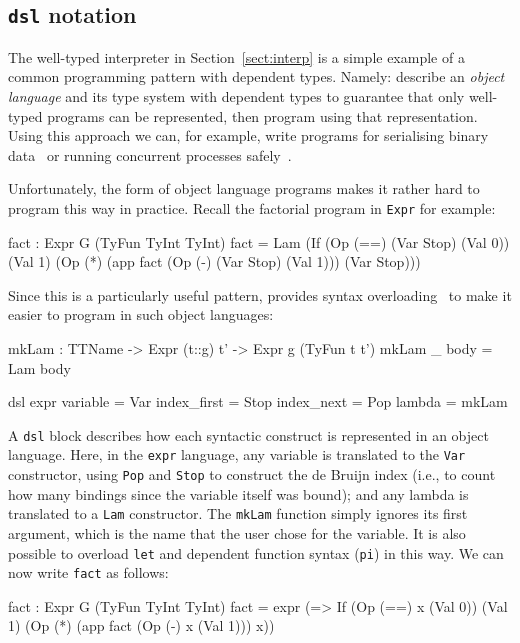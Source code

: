 \subsection{\texttt{dsl} notation}

The well-typed interpreter in Section~\ref{sect:interp} is a simple example of a common programming pattern with dependent types.
Namely: describe an \emph{object language} and its type system with dependent types to guarantee that only well-typed programs can be represented, then program using that representation.
Using this approach we can, for example, write programs for serialising binary data~\cite{plpv11} or running concurrent processes safely~\cite{cbconc-fi}.

Unfortunately, the form of object language programs makes it rather hard to program this way in practice.
Recall the factorial program in \texttt{Expr} for example:

\begin{code}
fact : Expr G (TyFun TyInt TyInt)
fact = Lam (If (Op (==) (Var Stop) (Val 0))
               (Val 1) (Op (*) (app fact (Op (-) (Var Stop) (Val 1)))
                               (Var Stop)))
\end{code}

\noindent
Since this is a particularly useful pattern, \Idris{} provides syntax overloading~\cite{res-dsl-padl12} to make it easier to program in such object languages:

\begin{code}
mkLam : TTName -> Expr (t::g) t' -> Expr g (TyFun t t')
mkLam _ body = Lam body

dsl expr
    variable    = Var
    index_first = Stop
    index_next  = Pop
    lambda      = mkLam
\end{code}

\noindent
A \texttt{dsl} block describes how each syntactic construct is represented in an object language.
Here, in the \texttt{expr} language, any variable is translated to the \texttt{Var} constructor, using \texttt{Pop} and \texttt{Stop} to construct the de Bruijn index (i.e., to count how many bindings since the variable itself was bound); and any \Idris{} lambda is translated to a \texttt{Lam} constructor.
The \texttt{mkLam} function simply ignores its first argument, which is the name that the user chose for the variable.
It is also possible to overload \texttt{let} and dependent function syntax (\texttt{pi}) in this way.
We can now write \texttt{fact} as follows:

\begin{code}
fact : Expr G (TyFun TyInt TyInt)
fact = expr (\x => If (Op (==) x (Val 0))
                      (Val 1) (Op (*) (app fact (Op (-) x (Val 1))) x))
\end{code}

